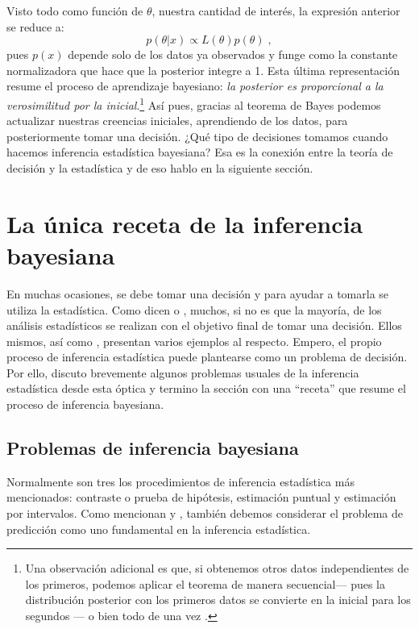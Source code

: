 Visto todo como función de $\theta$, nuestra cantidad de interés, la expresión anterior se reduce a:  
\begin{equation} \label{equation:Bayes_Prop}
p(\theta|x) \propto L(\theta)p(\theta)\;,
\end{equation}
pues $p(x)$ depende solo de los datos ya observados y funge como la constante normalizadora que hace que la posterior integre a 1. Esta última representación resume el proceso de aprendizaje bayesiano: \textit{la posterior es proporcional a la verosimilitud por la inicial}.\footnote{Una observación adicional es que, si obtenemos otros datos independientes de los primeros, podemos aplicar el teorema de manera secuencial--- pues la distribución posterior con los primeros datos se convierte en la inicial para los segundos --- o bien todo de una vez \parencites[37-39]{Lee12}[35-36]{GP16}[23]{Robert07}.} Así pues, gracias al teorema de Bayes podemos actualizar nuestras creencias iniciales, aprendiendo de los datos, para posteriormente tomar una decisión. ¿Qué tipo de decisiones tomamos cuando hacemos inferencia estadística bayesiana? Esa es la conexión entre la teoría de decisión y la estadística y de eso hablo en la siguiente sección. 

\section{La única receta de la inferencia bayesiana}

En muchas ocasiones, se debe tomar una decisión y para ayudar a tomarla se utiliza la estadística. Como dicen \textcite[237]{Gelman13} o \textcite[1]{Robert07}, muchos, si no es que la mayoría, de los análisis estadísticos se realizan con el objetivo final de tomar una decisión. Ellos mismos, así como \textcite{Berger85}, presentan varios ejemplos al respecto. Empero, el propio proceso de inferencia estadística puede plantearse como un problema de decisión. Por ello, discuto brevemente algunos problemas usuales de la inferencia estadística desde esta óptica y termino la sección con una ``receta'' que resume el proceso de inferencia bayesiana.

\subsection{Problemas de inferencia bayesiana}

Normalmente son tres los procedimientos de inferencia estadística más mencionados: contraste o prueba de hipótesis, estimación puntual y estimación por intervalos. Como mencionan \textcite[58-59]{Mendoza11} y \textcite[7]{Robert07}, también debemos considerar el problema de predicción como uno fundamental en la inferencia estadística. 

